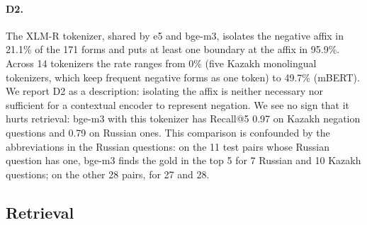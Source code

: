 \documentclass[11pt]{article}
\begin{document}
\paragraph{D2.} The XLM-R tokenizer, shared by e5 and bge-m3, isolates the negative affix in 21.1\% of the
171 forms and puts at least one boundary at the affix in 95.9\%. Across 14 tokenizers the rate ranges from
0\% (five Kazakh monolingual tokenizers, which keep frequent negative forms as one token) to 49.7\% (mBERT).
We report D2 as a description: isolating the affix is neither necessary nor sufficient for a contextual
encoder to represent negation. We see no sign that it hurts retrieval: bge-m3 with this tokenizer has
Recall@5 0.97 on Kazakh negation questions and 0.79 on Russian ones. This comparison is confounded by the
abbreviations in the Russian questions: on the 11 test pairs whose Russian question has one, bge-m3 finds the
gold in the top 5 for 7 Russian and 10 Kazakh questions; on the other 28 pairs, for 27 and 28.

\subsection{Retrieval}
\end{document}
